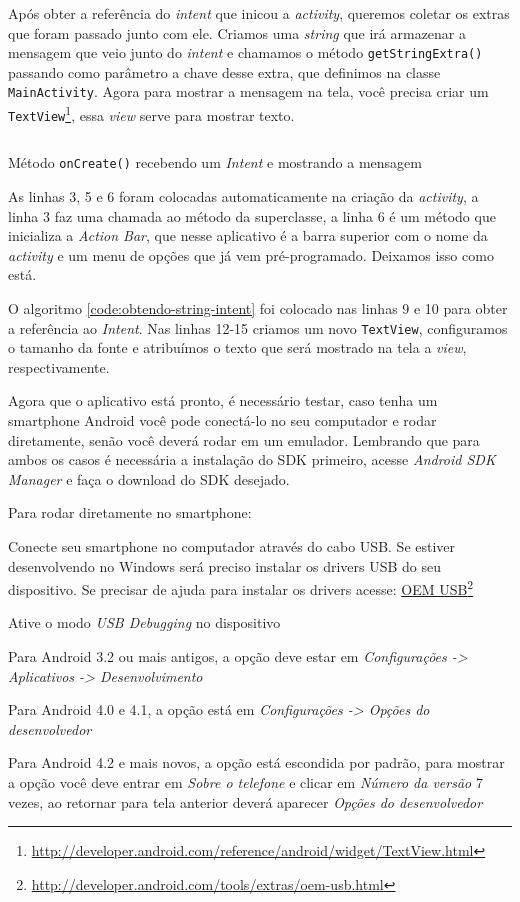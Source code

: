 \documentclass[a4paper,12pt,brazil]{book}
\begin{document}
\begin{singlespace}
Após obter a referência do \emph{intent} que inicou a \emph{activity}, queremos coletar os extras que foram passado junto com ele. Criamos uma \emph{string} que irá armazenar a mensagem que veio junto do \emph{intent} e chamamos o método \texttt{getStringExtra()} passando como parâmetro a chave desse extra, que definimos na classe \texttt{MainActivity}. 
Agora para mostrar a mensagem na tela, você precisa criar um \texttt{TextView}\footnote{\href{http://developer.android.com/reference/android/widget/TextView.html}{http://developer.android.com/reference/android/widget/TextView.html}}, essa \emph{view} serve para mostrar texto. 

\begin{listing}[H]
\inputminted[linenos=true,fontsize=\small,frame=lines, framesep=2mm, tabsize=2,numbersep=5pt]{java}{src/firstapp/9.java}
\caption{Método \texttt{onCreate()} recebendo um \emph{Intent} e mostrando a mensagem}
\end{listing}

As linhas 3, 5 e 6 foram colocadas automaticamente na criação da \emph{activity}, a linha 3 faz uma chamada ao método da superclasse, a linha 6 é um método que inicializa a \emph{Action Bar}, que nesse aplicativo é a barra superior com o nome da \emph{activity} e um menu de opções que já vem pré-programado. Deixamos isso como está.

O algoritmo \ref{code:obtendo-string-intent} foi colocado nas linhas 9 e 10 para obter a referência ao \emph{Intent}. Nas linhas 12-15 criamos um novo \texttt{TextView}, configuramos o tamanho da fonte e atribuímos o texto que será mostrado na tela a \emph{view}, respectivamente. 

Agora que o aplicativo está pronto, é necessário testar, caso tenha um smartphone Android você pode conectá-lo no seu computador e rodar diretamente, senão você deverá rodar em um emulador. Lembrando que para ambos os casos é necessária a instalação do SDK primeiro, acesse \emph{Android SDK Manager} e faça o download do SDK desejado.

Para rodar diretamente no smartphone:
\be
\item Conecte seu smartphone no computador através do cabo USB. Se estiver desenvolvendo no Windows será preciso instalar os drivers USB do seu dispositivo. Se precisar de ajuda para instalar os drivers acesse: \href{http://developer.android.com/tools/extras/oem-usb.html}{OEM USB}\footnote{\href{http://developer.android.com/tools/extras/oem-usb.html}{http://developer.android.com/tools/extras/oem-usb.html}}
\item Ative o modo \emph{USB Debugging} no dispositivo
	\bi
	\item Para Android 3.2 ou mais antigos, a opção deve estar em \textit{Configurações -> Aplicativos	 -> Desenvolvimento}
	\item Para Android 4.0 e 4.1, a opção está em \textit{Configurações -> Opções do desenvolvedor}
	\item Para Android 4.2 e mais novos, a opção está escondida por padrão, para mostrar a opção você deve entrar em \textit{Sobre o telefone} e clicar em \textit{Número da versão} 7 vezes, ao retornar para tela anterior deverá aparecer \textit{Opções do desenvolvedor}
	\ei
\ee


\end{singlespace}
\end{document}
